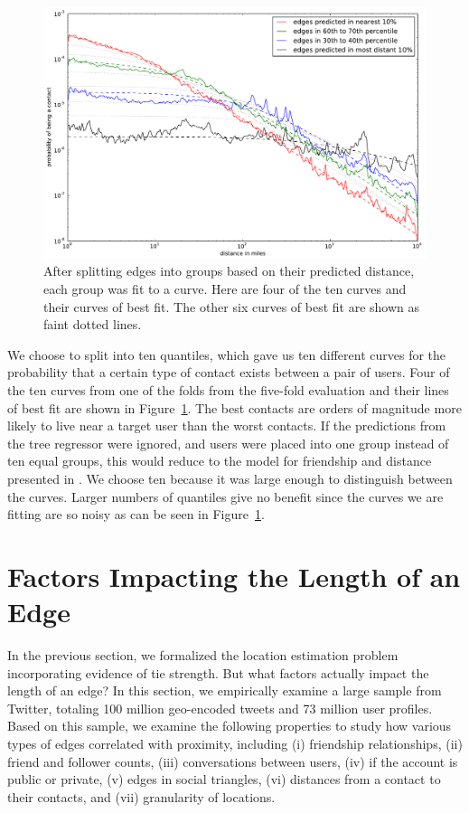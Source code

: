 \documentclass[letterpaper]{article}
\begin{document}
\begin{figure}[tbh]
\centering
\includegraphics[width=.9\linewidth]{figures/vect_fit.pdf}
\caption{
After splitting edges into groups based on their predicted distance, each group
was fit to a curve. Here are four of the ten curves and their curves of best
fit. The other six curves of best fit are shown as faint dotted lines.}
\label{fig:NearProbFit}
\end{figure}

We choose to split into ten quantiles, which gave us ten different curves for the probability that a certain type of contact exists between a pair of users.  Four of the ten curves from one of the folds from the five-fold evaluation and their lines of best fit are shown in Figure~\ref{fig:NearProbFit}. The best contacts are orders of magnitude more likely to live near a target user than the worst contacts. If the predictions from the tree regressor were ignored, and users were placed into one group instead of ten equal groups, this would reduce to the model for friendship and distance presented in \cite{backstrom2010find}. We choose ten because it was large enough to distinguish between the curves.  Larger numbers of quantiles give no benefit since the curves we are fitting are so noisy as can be seen in Figure~\ref{fig:NearProbFit}.



\section{Factors Impacting the Length of an Edge}
In the previous section, we formalized the location estimation problem incorporating evidence of tie strength. But what factors actually impact the length of an edge? In this section, we empirically examine a large sample from Twitter, totaling 100 million geo-encoded tweets and 73 million user profiles.
%
Based on this sample, we examine the following properties to study how various
types of edges correlated with proximity, including
    (i) friendship relationships,
    (ii) friend and follower counts,
    (iii) conversations between users,
    (iv) if the account is public or private,
    (v) edges in social triangles,
    (vi) distances from a contact to their contacts, and
    (vii) granularity of locations.
\end{document}
